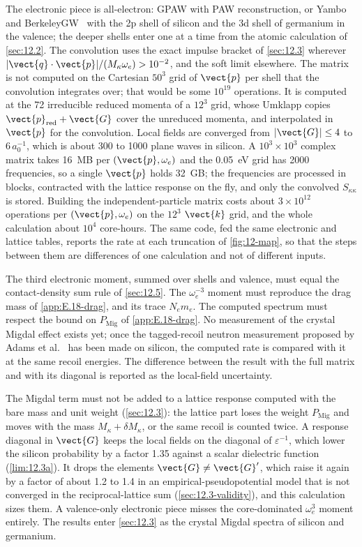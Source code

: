 The electronic piece is all-electron: GPAW with PAW reconstruction, or Yambo~\cite{sangalli2019many} and BerkeleyGW~\cite{deslippe2012berkeleygw} with the 2p shell of silicon and the 3d shell of germanium in the valence; the deeper shells enter one at a time from the atomic calculation of \cref{sec:12.2}. The convolution uses the exact impulse bracket of \cref{sec:12.3} wherever $|\vect{q}\cdot\vect{p}|/(M_\kappa\omega_e) > 10^{-2}$, and the soft limit elsewhere. The matrix is not computed on the Cartesian $50^3$ grid of $\vect{p}$ per shell that the convolution integrates over; that would be some $10^{19}$ operations. It is computed at the 72 irreducible reduced momenta of a $12^3$ grid, whose Umklapp copies $\vect{p}_{\mathrm{red}} + \vect{G}$ cover the unreduced momenta, and interpolated in $\vect{p}$ for the convolution. Local fields are converged from $|\vect{G}| \le 4$ to $6\,a_0^{-1}$, which is about 300 to 1000 plane waves in silicon. A $10^3\times10^3$ complex matrix takes \SI{16}{MB} per $(\vect{p},\omega_e)$ and the \SI{0.05}{eV} grid has 2000 frequencies, so a single $\vect{p}$ holds \SI{32}{GB}; the frequencies are processed in blocks, contracted with the lattice response on the fly, and only the convolved $S_{\kappa\kappa}$ is stored. Building the independent-particle matrix costs about $3\times10^{12}$ operations per $(\vect{p},\omega_e)$ on the $12^3$ $\vect{k}$ grid, and the whole calculation about $10^4$ core-hours. The same code, fed the same electronic and lattice tables, reports the rate at each truncation of \cref{fig:12-map}, so that the steps between them are differences of one calculation and not of different inputs.

The third electronic moment, summed over shells and valence, must equal the contact-density sum rule of \cref{sec:12.5}. The $\omega_e^{-3}$ moment must reproduce the drag mass of \cref{app:E.18-drag}, and its trace $N_e m_e$. The computed spectrum must respect the bound on $P_{\mathrm{Mig}}$ of \cref{app:E.18-drag}. No measurement of the crystal Migdal effect exists yet; once the tagged-recoil neutron measurement proposed by Adams et al.~\cite{adams2023measuring} has been made on silicon, the computed rate is compared with it at the same recoil energies. The difference between the result with the full matrix and with its diagonal is reported as the local-field uncertainty.

The Migdal term must not be added to a lattice response computed with the bare mass and unit weight (\cref{sec:12.3}): the lattice part loses the weight $P_{\mathrm{Mig}}$ and moves with the mass $M_\kappa + \delta M_\kappa$, or the same recoil is counted twice. A response diagonal in $\vect{G}$ keeps the local fields on the diagonal of $\varepsilon^{-1}$, which lower the silicon probability by a factor 1.35 against a scalar dielectric function (\cref{lim:12.3a}). It drops the elements $\vect{G}\neq\vect{G}'$, which raise it again by a factor of about 1.2 to 1.4 in an empirical-pseudopotential model that is not converged in the reciprocal-lattice sum (\cref{sec:12.3-validity}), and this calculation sizes them. A valence-only electronic piece misses the core-dominated $\omega_e^3$ moment entirely. The results enter \cref{sec:12.3} as the crystal Migdal spectra of silicon and germanium.

